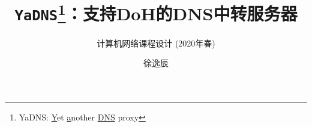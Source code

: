 \documentclass{cpp}
\title{\texttt{YaDNS}\footnote{YaDNS: \underline{Y}et \underline{a}nother \underline{DNS} proxy}：支持DoH的DNS中转服务器}
\subtitle{计算机网络课程设计 (2020年春)}
\author[1,2]{徐逸辰}
\affil[1]{北京邮电大学，计算机学院}
\affil[2]{2018213555}
\theoremstyle{nobreak}
\theoremstyle{nonumberplain}
\begin{document}
\maketitle


\setcounter{tocdepth}{0}
\tableofcontents

\newpage











\newpage

\begin{appendices}

\end{appendices}
\end{document}
